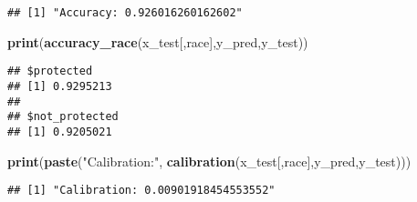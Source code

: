 \documentclass[
]{article}
\newenvironment{Shaded}{\begin{snugshade}}{\end{snugshade}}
\newcommand{\AttributeTok}[1]{\textcolor[rgb]{0.13,0.29,0.53}{#1}}
\newcommand{\FunctionTok}[1]{\textcolor[rgb]{0.13,0.29,0.53}{\textbf{#1}}}
\newcommand{\NormalTok}[1]{#1}
\newcommand{\OtherTok}[1]{\textcolor[rgb]{0.56,0.35,0.01}{#1}}
\newcommand{\SpecialCharTok}[1]{\textcolor[rgb]{0.81,0.36,0.00}{\textbf{#1}}}
\newcommand{\StringTok}[1]{\textcolor[rgb]{0.31,0.60,0.02}{#1}}
\begin{document}
\begin{verbatim}
## [1] "Accuracy: 0.926016260162602"
\end{verbatim}

\begin{Shaded}
\begin{Highlighting}[]
\FunctionTok{print}\NormalTok{(}\FunctionTok{accuracy\_race}\NormalTok{(x\_test[,}\StringTok{\textquotesingle{}race\textquotesingle{}}\NormalTok{],y\_pred,y\_test))}
\end{Highlighting}
\end{Shaded}

\begin{verbatim}
## $protected
## [1] 0.9295213
## 
## $not_protected
## [1] 0.9205021
\end{verbatim}

\begin{Shaded}
\begin{Highlighting}[]
\FunctionTok{print}\NormalTok{(}\FunctionTok{paste}\NormalTok{(}\StringTok{"Calibration:"}\NormalTok{, }\FunctionTok{calibration}\NormalTok{(x\_test[,}\StringTok{\textquotesingle{}race\textquotesingle{}}\NormalTok{],y\_pred,y\_test)))}
\end{Highlighting}
\end{Shaded}

\begin{verbatim}
## [1] "Calibration: 0.00901918454553552"
\end{verbatim}

\begin{Shaded}
\end{Shaded}
\end{document}
